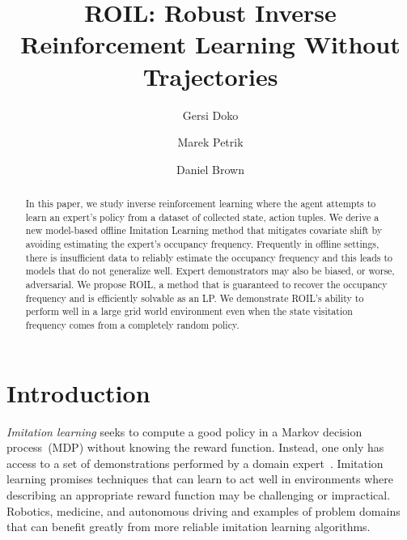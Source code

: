 \documentclass[11pt]{uai2023}
\title{ROIL: Robust Inverse Reinforcement Learning Without Trajectories}
\author[1]{Gersi Doko}
\author[1]{Marek Petrik}
\author[2]{Daniel Brown}
\affil[1]{
Computer Science Dept.\\
University of New Hampshire\\
Durham, New Hampshire, USA\\
FIRST.LAST@unh.edu
}
\affil[2]{
}
\begin{document}
\maketitle

\begin{abstract}
In this paper, we study inverse reinforcement learning where the agent attempts to learn an expert's policy from a dataset of collected state, action tuples. We derive a new model-based offline Imitation Learning method that mitigates covariate shift by avoiding estimating the expert's occupancy frequency. Frequently in offline settings, there is insufficient data to reliably estimate the occupancy frequency and this leads to models that do not generalize well. Expert demonstrators may also be biased, or worse, adversarial. We propose ROIL, a method that is guaranteed to recover the occupancy frequency and is efficiently solvable as an LP. We demonstrate ROIL's ability to perform well in a large grid world environment even when the state visitation frequency comes from a completely random policy.
\end{abstract}

\section{Introduction}

\emph{Imitation learning} seeks to compute a good policy in a Markov decision process~(MDP) without knowing the reward function. Instead, one only has access to a set of demonstrations performed by a domain expert~\cite{chang2021mitigating, Panaganti2023, Spencer2021, Rashidinejad2022}. Imitation learning promises techniques that can learn to act well in environments where describing an appropriate reward function may be challenging or impractical. Robotics, medicine, and autonomous driving and examples of problem domains that can benefit greatly from more reliable imitation learning algorithms. 
\end{document}
